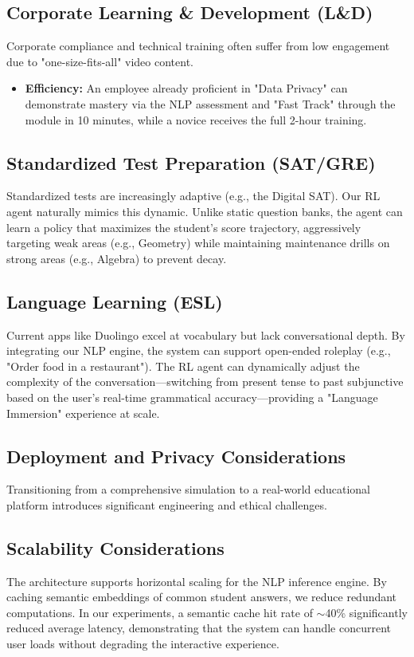 \documentclass[conference]{IEEEtran}
\begin{document}
\subsection{Corporate Learning \& Development (L\&D)}
Corporate compliance and technical training often suffer from low engagement due to "one-size-fits-all" video content.
\begin{itemize}
    \item \textbf{Efficiency:} An employee already proficient in "Data Privacy" can demonstrate mastery via the NLP assessment and "Fast Track" through the module in 10 minutes, while a novice receives the full 2-hour training.
\end{itemize}

\subsection{Standardized Test Preparation (SAT/GRE)}
Standardized tests are increasingly adaptive (e.g., the Digital SAT). Our RL agent naturally mimics this dynamic. Unlike static question banks, the agent can learn a policy that maximizes the student's score trajectory, aggressively targeting weak areas (e.g., Geometry) while maintaining maintenance drills on strong areas (e.g., Algebra) to prevent decay.

\subsection{Language Learning (ESL)}
Current apps like Duolingo excel at vocabulary but lack conversational depth. By integrating our NLP engine, the system can support open-ended roleplay (e.g., "Order food in a restaurant"). The RL agent can dynamically adjust the complexity of the conversation—switching from present tense to past subjunctive based on the user's real-time grammatical accuracy—providing a "Language Immersion" experience at scale.

\subsection{Deployment and Privacy Considerations}
Transitioning from a comprehensive simulation to a real-world educational platform introduces significant engineering and ethical challenges.

\subsection{Scalability Considerations}
The architecture supports horizontal scaling for the NLP inference engine. By caching semantic embeddings of common student answers, we reduce redundant computations. In our experiments, a semantic cache hit rate of $\sim$40\% significantly reduced average latency, demonstrating that the system can handle concurrent user loads without degrading the interactive experience.
\end{document}
